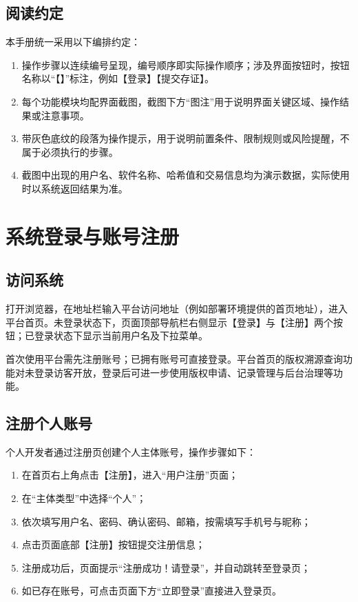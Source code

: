 \documentclass[UTF8,a4paper,12pt]{ctexart}
\newcommand{\notice}[1]{%
  \par\vspace{0.6em}\noindent
  {\setlength{\fboxsep}{6pt}%
   \colorbox{gray!8}{\parbox{\dimexpr\linewidth-12pt\relax}{%
     \setlength{\parindent}{2em}\small #1}}}%
  \par\vspace{0.6em}%
}
\begin{document}
\subsection{阅读约定}
\indent 本手册统一采用以下编排约定：\par

\begin{enumerate}
  \item 操作步骤以连续编号呈现，编号顺序即实际操作顺序；涉及界面按钮时，按钮名称以“【】”标注，例如【登录】【提交存证】。
  \item 每个功能模块均配界面截图，截图下方“图注”用于说明界面关键区域、操作结果或注意事项。
  \item 带灰色底纹的段落为操作提示，用于说明前置条件、限制规则或风险提醒，不属于必须执行的步骤。
  \item 截图中出现的用户名、软件名称、哈希值和交易信息均为演示数据，实际使用时以系统返回结果为准。
\end{enumerate}

\section{系统登录与账号注册}

\subsection{访问系统}
\indent 打开浏览器，在地址栏输入平台访问地址（例如部署环境提供的首页地址），进入平台首页。未登录状态下，页面顶部导航栏右侧显示【登录】与【注册】两个按钮；已登录状态下显示当前用户名及下拉菜单。\par

\notice{首次使用平台需先注册账号；已拥有账号可直接登录。平台首页的版权溯源查询功能对未登录访客开放，登录后可进一步使用版权申请、记录管理与后台治理等功能。}

\subsection{注册个人账号}
\indent 个人开发者通过注册页创建个人主体账号，操作步骤如下：\par

\begin{enumerate}
  \item 在首页右上角点击【注册】，进入“用户注册”页面；
  \item 在“主体类型”中选择“个人”；
  \item 依次填写用户名、密码、确认密码、邮箱，按需填写手机号与昵称；
  \item 点击页面底部【注册】按钮提交注册信息；
  \item 注册成功后，页面提示“注册成功！请登录”，并自动跳转至登录页；
  \item 如已存在账号，可点击页面下方“立即登录”直接进入登录页。
\end{enumerate}
\end{document}
